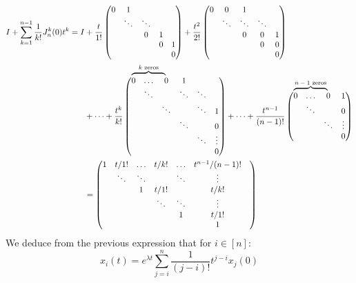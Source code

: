 \documentclass[11pt]{article}
\newcommand\bovermat[2]{%
  \makebox[0pt][l]{$\smash{\overbrace{\phantom{%
    \begin{matrix}#2\end{matrix}}}^{\text{#1}}}$}#2}
\begin{document}
\begin{align*}
    I+\sum_{k=1}^{n-1}\frac{1}{k!}J_n^k(0) t^k = I &+ \frac{t}{1!}
    \begin{pmatrix}
    0&1&&\\
    &\ddots&\ddots&&\\
    &&0&1&\\
    &&&0&1\\
    &&&&0
    \end{pmatrix} + \frac{t^2}{2!}
    \begin{pmatrix}
    0&0&1&\\
    &\ddots&\ddots&\ddots&\\
    &&0&0&1\\
    &&&0&0\\
    &&&&0
    \end{pmatrix}\\ \\
    &+ \dots +\frac{t^k}{k!}
    \begin{pmatrix}
    \bovermat{$k$ zeros}{0&\dots&0}&1&\\
    &\ddots&&\ddots&\ddots&\\
    &&\ddots&&\ddots&1\\
    &&&\ddots&&0\\
    &&&&\ddots&\vdots\\
    &&&&&0
    \end{pmatrix}
    +\dots+\frac{t^{n-1}}{(n-1)!}
    \begin{pmatrix}
    \bovermat{$n-1$ zeros}{0&\dots&0}&1\\
     &\ddots&&0\\
     & & \ddots & \vdots\\
     & & & 0\\
    \end{pmatrix}\\
    &=
    \begin{pmatrix}
    1 & t/1! & \dots & t/k! & \dots & t^{n-1}/(n-1)!\\
      & \ddots & \ddots &  & \ddots & \vdots\\
      & & 1 & t/1! & & t/k! &\\
      & & & \ddots & \ddots & \vdots\\
      & & & & 1 & t/1!\\
      & & & & & 1\\
    \end{pmatrix}
\end{align*}
We deduce from the previous expression that for $i\in [n]$:
\begin{equation*}
    x_i(t)=e^{\lambda t}\sum^{n}_{j=i}\frac{1}{(j-i)!}t^{j-i}x_j(0)
\end{equation*}
\end{document}
